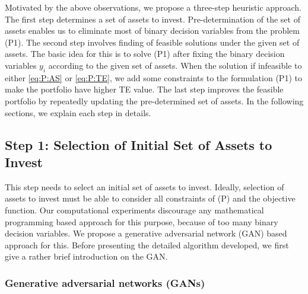 \documentclass[11pt]{article}
\begin{document}
	Motivated by the above observations, we propose a three-step heuristic approach. The first step determines a set of assets to invest. Pre-determination of the set of assets enables us to eliminate most of binary decision variables from the problem (P1). The second step involves finding of feasible solutions under the given set of assets. The basic idea for this is to solve (P1) after fixing the binary decision variables $y_i$ according to the given set of assets. When the solution if infeasible to either \eqref{eq:P:AS} or \eqref{eq:P:TE}, we add some constraints to the formulation (P1) to make the portfolio have higher TE value. The last step improves the feasible portfolio by repeatedly updating the pre-determined set of assets. In the following sections, we explain each step in details.
	
	\subsection{Step 1: Selection of Initial Set of Assets to Invest}
	
	This step needs to select an initial set of assets to invest. Ideally, selection of assets to invest must be able to consider all constraints of (P) and the objective function. Our computational experiments discourage any mathematical programming based approach for this purpose, because of too many binary decision variables. We propose a generative adversarial network (GAN) based approach for this. Before presenting the detailed algorithm developed, we first give a rather brief introduction on the GAN.
	
	
	\subsubsection{Generative adversarial networks (GANs)}
	
\end{document}
